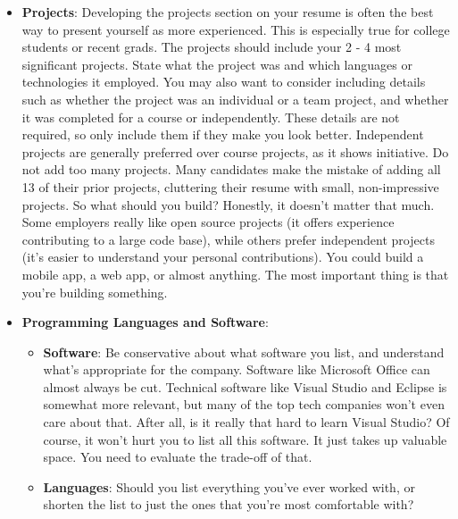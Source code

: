\documentclass{report}
\begin{document}
\begin{itemize}
\begin{center}
            \end{center}
            Not everything you did will fit into this approach, but the principle is the same: show what you did, how you did it, and what the results were. Ideally, you should try to make the results "measurable" somehow.
        \item \textbf{Projects}: Developing the projects section on your resume is often the best way to present yourself as more experienced. This is especially true for college students or recent grads. 
            \bigbreak \noindent 
            The projects should include your 2 - 4 most significant projects. State what the project was and which languages or technologies it employed. You may also want to consider including details such as whether the project was an individual or a team project, and whether it was completed for a course or independently. These details are not required, so only include them if they make you look better. Independent projects are generally preferred over course projects, as it shows initiative.
            \bigbreak \noindent 
            Do not add too many projects. Many candidates make the mistake of adding all 13 of their prior projects, cluttering their resume with small, non-impressive projects.
            \bigbreak \noindent 
            So what should you build? Honestly, it doesn't matter that much. Some employers really like open source projects (it offers experience contributing to a large code base), while others prefer independent projects (it's easier to understand your personal contributions). You could build a mobile app, a web app, or almost anything. The most important thing is that you're building something.
        \item \textbf{Programming Languages and Software}: 
            \begin{itemize}
                \item \textbf{Software}: Be conservative about what software you list, and understand what's appropriate for the company. Software like Microsoft Office can almost always be cut. Technical software like Visual Studio and Eclipse is somewhat more relevant, but many of the top tech companies won't even care about that. After all, is it really that hard to learn Visual Studio? Of course, it won't hurt you to list all this software. It just takes up valuable space. You need to evaluate the trade-off of that.
                \item \textbf{Languages}: Should you list everything you've ever worked with, or shorten the list to just the ones that you're most comfortable with?

\end{itemize}
\end{itemize}
\end{document}

